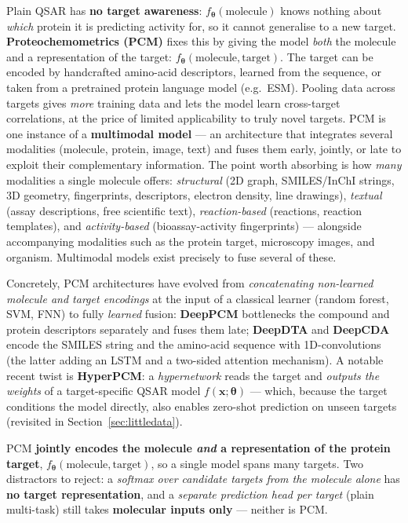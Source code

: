 \documentclass[11pt, oneside]{book}
\newcommand{\params}{\boldsymbol{\theta}}   %
\newcommand{\xvec}{\mathbf{x}}
\begin{document}
Plain QSAR has \textbf{no target awareness}: $f_{\params}(\text{molecule})$ knows
nothing about \emph{which} protein it is predicting activity for, so it cannot
generalise to a new target. \textbf{Proteochemometrics (PCM)} fixes this by giving
the model \emph{both} the molecule and a representation of the target:
$f_{\params}(\text{molecule},\text{target})$. The target can be encoded by
handcrafted amino-acid descriptors, learned from the sequence, or taken from a
pretrained protein language model (e.g.\ ESM). Pooling data across targets gives
\emph{more} training data and lets the model learn cross-target correlations, at
the price of limited applicability to truly novel targets. PCM is one instance of
a \textbf{multimodal model} --- an architecture that integrates several modalities
(molecule, protein, image, text) and fuses them early, jointly, or late to exploit
their complementary information. The point worth absorbing is how \emph{many}
modalities a single molecule offers: \emph{structural} (2D graph, SMILES/InChI
strings, 3D geometry, fingerprints, descriptors, electron density, line drawings),
\emph{textual} (assay descriptions, free scientific text), \emph{reaction-based}
(reactions, reaction templates), and \emph{activity-based} (bioassay-activity
fingerprints) --- alongside accompanying modalities such as the protein target,
microscopy images, and organism. Multimodal models exist precisely to fuse several
of these.

Concretely, PCM architectures have evolved from \emph{concatenating non-learned
molecule and target encodings} at the input of a classical learner (random forest,
SVM, FNN) to fully \emph{learned} fusion: \textbf{DeepPCM} bottlenecks the compound
and protein descriptors separately and fuses them late; \textbf{DeepDTA} and
\textbf{DeepCDA} encode the SMILES string and the amino-acid sequence with
1D-convolutions (the latter adding an LSTM and a two-sided attention mechanism). A
notable recent twist is \textbf{HyperPCM}: a \emph{hypernetwork} reads the target
and \emph{outputs the weights} of a target-specific QSAR model
$f(\xvec;\params)$ --- which, because the target conditions the model directly,
also enables zero-shot prediction on unseen targets (revisited in
Section~\ref{sec:littledata}).

\begin{starbox}[title={Exam-critical: what makes a model proteochemometric}]
PCM \textbf{jointly encodes the molecule \emph{and} a representation of the protein
target}, $f_{\params}(\text{molecule},\text{target})$, so a single model spans many
targets. Two distractors to reject: a \emph{softmax over candidate targets from the
molecule alone} has \textbf{no target representation}, and a \emph{separate
prediction head per target} (plain multi-task) still takes \textbf{molecular inputs
only} --- neither is PCM.
\end{starbox}
\end{document}
